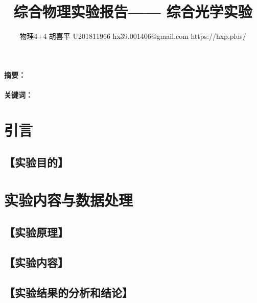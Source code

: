 \documentclass{ctexart}
\date{}
\newcommand{\generatetitle}[6]{\title{\zihao{3}\heiti#1} \author{#2 \quad
\quad #3 \quad\quad #4 \quad\quad #5 \quad\quad #6} \maketitle\thispagestyle{fancy}}
\let\oldsubsection\subsection
\renewcommand{\subsection}[1]{\oldsubsection{\!\!\!\!\!\!【#1】}}
\let\oldparagraph\paragraph
\renewcommand{\paragraph}[1]{\oldparagraph{#1：\!\!\!\!\!\!}}
\begin{document}
    \generatetitle{综合物理实验报告——
    综合光学实验}{物理4+4}{胡喜平}{U201811966}{hx39.001406@gmail.com}{https://hxp.plus/}

    \paragraph{摘要}

    \paragraph{关键词}

    \section{引言}

    \subsection{实验目的}

    \section{实验内容与数据处理}

    \subsection{实验原理}

    \subsection{实验内容}

    \subsection{实验结果的分析和结论}
\end{document}
